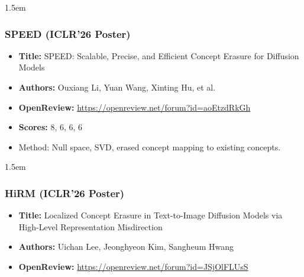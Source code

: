 \documentclass[11pt,a4paper]{article}
\begin{document}
\begin{adjustwidth}{1.5em}{}
\subsubsection{SPEED (ICLR'26 Poster)}

\begin{itemize}
  \item \textbf{Title:} SPEED: Scalable, Precise, and Efficient Concept Erasure for Diffusion Models
  \item \textbf{Authors:} Ouxiang Li, Yuan Wang, Xinting Hu, et al.
  \item \textbf{OpenReview:} \url{https://openreview.net/forum?id=aoEtzdRkGh}
  \item \textbf{Scores:} 8, 6, 6, 6
  \item Method: Null space, SVD, erased concept mapping to existing concepts.
\end{itemize}

\end{adjustwidth}

\begin{adjustwidth}{1.5em}{}
\subsubsection{HiRM (ICLR'26 Poster)}

\begin{itemize}
  \item \textbf{Title:} Localized Concept Erasure in Text-to-Image Diffusion Models via High-Level Representation Misdirection
  \item \textbf{Authors:} Uichan Lee, Jeonghyeon Kim, Sangheum Hwang
  \item \textbf{OpenReview:} \url{https://openreview.net/forum?id=JSjOlFLUsS}
\end{itemize}

\end{adjustwidth}
\end{document}

